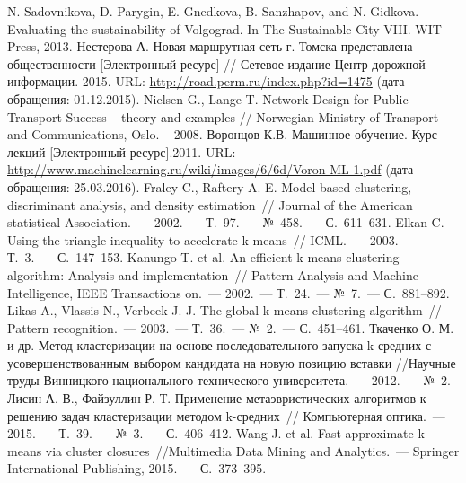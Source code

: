 \renewcommand{\bibname}{%
    \vspace{-.9em}\begin{center}
        Список используемой литературы
    \end{center}\vspace{-2em}
}

\pagestyle{empty}

\begin{thebibliography}{99}
     N. Sadovnikova, D. Parygin, E. Gnedkova, B. Sanzhapov, and N. Gidkova. 
        Evaluating the sustainability of Volgograd. In The Sustainable City VIII. WIT Press, 2013.
     Нестерова А. Новая маршрутная сеть г. Томска представлена общественности 
        [Электронный ресурс] // Сетевое издание Центр дорожной информации. 2015. URL: 
        \url{http://road.perm.ru/index.php?id=1475} (дата обращения: 01.12.2015).
     Nielsen G., Lange T. Network Design for Public Transport Success -- theory and 
        examples // Norwegian Ministry of Transport and Communications, Oslo. -- 2008.
     Воронцов К.В. Машинное обучение. Курс лекций [Электронный ресурс].2011. URL: \url{http://www.machinelearning.ru/wiki/images/6/6d/Voron-ML-1.pdf} (дата обращения: 25.03.2016).
     Fraley C., Raftery A. E. Model-based clustering, discriminant analysis, and density estimation~// Journal of the American statistical Association.~--- 2002.~--- Т.~97.~--- №~458.~--- С.~611--631.
     Elkan C. Using the triangle inequality to accelerate k-means~// ICML.~--- 2003.~--- Т.~3.~--- С.~147--153.
     Kanungo T. et al. An efficient k-means clustering algorithm: Analysis and implementation~// Pattern Analysis and Machine Intelligence, IEEE Transactions on.~--- 2002.~--- Т.~24.~--- №~7.~--- С.~881--892.
     Likas A., Vlassis N., Verbeek J. J. The global k-means clustering algorithm~// Pattern recognition.~--- 2003.~--- Т.~36.~--- №~2.~--- С.~451--461.
     Ткаченко О. М. и др. Метод кластеризации на основе последовательного запуска k-средних с усовершенствованным выбором кандидата на новую позицию вставки //Научные труды Винницкого национального технического университета.~--- 2012.~--- №~2.
     Лисин А. В., Файзуллин Р. Т. Применение метаэвристических алгоритмов к решению задач кластеризации методом k-средних~// Компьютерная оптика.~--- 2015.~--- Т.~39.~--- №~3.~--- С.~406--412.
     Wang J. et al. Fast approximate k-means via cluster closures~//Multimedia Data Mining and Analytics.~--- Springer International Publishing, 2015.~--- С.~373--395.

\end{thebibliography}
